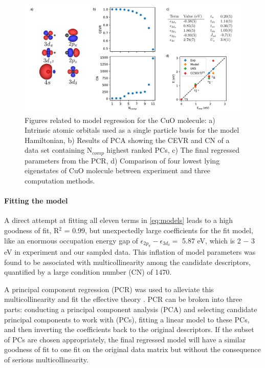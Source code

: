 \documentclass[12pt]{article}
\begin{document}
\begin{figure}
\centering
\includegraphics[width=1.0\linewidth]{./figs/cuo_regr_2.pdf}
\caption{Figures related to model regression for the CuO molecule: a) Intrinsic atomic orbitals used as a single particle basis for the model Hamiltonian, b) Results of PCA showing the CEVR and CN of a data set containing N$_{comp}$  highest ranked PCs, c) The final regressed parameters from the PCR, d) Comparison of four lowest lying eigenstates of CuO molecule between experiment and three computation methods.}
\label{fig:cuo_regr}
\end{figure}

\paragraph{Fitting the model}
A direct attempt at fitting all eleven terms in \eqref{eq:models} leads to a high goodness of fit, R$^2$ = 0.99, but unexpectedly large coefficients for the fit model, like an enormous occupation energy gap of $\epsilon_{2p_\pi} - \epsilon_{3d_\delta} = $ 5.87 eV, which is 2 $-$ 3 eV in experiment and our sampled data.
This inflation of model parameters was found to be associated with multicollinearity among the candidate descriptors, quantified by a large condition number (CN) of 1470.

A principal component regression (PCR) was used to alleviate this multicollinearity and fit the effective theory \cite{10.2307/2348005}.
PCR can be broken into three parts: conducting a principal component analysis (PCA) and selecting candidate principal components to work with (PCs), fitting a linear model to these PCs, and then inverting the coefficients back to the original descriptors.
If the subset of PCs are chosen appropriately, the final regressed model will have a similar goodness of fit to one fit on the original data matrix but without the consequence of serious multicollinearity.
\end{document}
